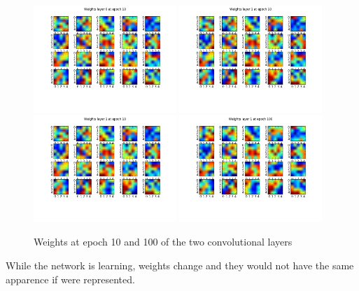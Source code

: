\begin{figure}[htb]
\centering
\includegraphics[width=0.48\textwidth]{images/images_lenet/w_layer0_epoch10.png}
\includegraphics[width=0.48\textwidth]{images/images_lenet/w_layer1_epoch10.png}
\includegraphics[width=0.48\textwidth]{images/images_lenet/w_layer1_epoch10.png}
\includegraphics[width=0.48\textwidth]{images/images_lenet/w_layer1_epoch100.png}

\caption{Weights at epoch 10 and 100 of the two convolutional layers } \label{fig:weights_lenet} 
\end{figure}

While the network is learning, weights change and they would not have the same apparence if were represented. \\


